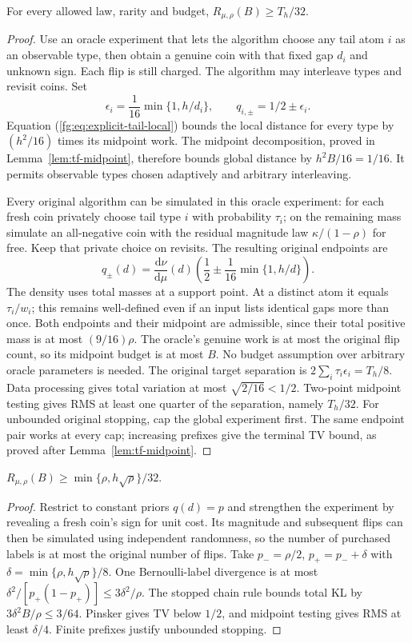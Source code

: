 \begin{lemma}\label{fg:lem:tail}
For every allowed law, rarity and budget, $R_{\mu,\rho}(B)\ge T_h/32$.
\end{lemma}
\begin{proof}
Use an oracle experiment that lets the algorithm choose any tail atom
$i$ as an observable type, then obtain a genuine coin with that fixed
gap $d_i$ and unknown sign. Each flip is still charged. The algorithm
may interleave types and revisit coins.
Set
\[
 \epsilon_i=\frac1{16}\min\{1,h/d_i\},\qquad
 q_{i,\pm}=1/2\pm\epsilon_i.
\]
Equation (\ref{fg:eq:explicit-tail-local}) bounds the local distance for
every type by $(h^2/16)$ times its midpoint work. The midpoint
decomposition, proved in Lemma~\ref{lem:tf-midpoint}, therefore bounds
global distance by $h^2B/16=1/16$. It permits observable types chosen
adaptively and arbitrary interleaving.

Every original algorithm can be simulated in this oracle experiment:
for each fresh coin privately choose tail type $i$ with probability
$\tau_i$; on the remaining mass simulate an all-negative coin with
the residual magnitude law $\kappa/(1-\rho)$ for free. Keep that
private choice on revisits. The resulting original endpoints are
\[
 q_\pm(d)=\frac{\mathrm d\nu}{\mathrm d\mu}(d)\left(\frac12\pm\frac1{16}\min\{1,h/d\}\right).
\]
The density uses total masses at a support point. At a distinct atom it
equals $\tau_i/w_i$; this remains well-defined even if an input lists
identical gaps more than once.
Both endpoints and their midpoint are admissible, since their total
positive mass is at most $(9/16)\rho$. The oracle's genuine work is
at most the original flip count, so its midpoint budget is at most $B$.
No budget assumption over arbitrary oracle parameters is needed.
The original target separation is
$2\sum_i\tau_i\epsilon_i=T_h/8$.
Data processing gives total variation at most
$\sqrt{2/16}<1/2$. Two-point midpoint testing gives RMS at least one
quarter of the separation, namely $T_h/32$.
For unbounded original stopping, cap the global experiment first.
The same endpoint pair works at every cap; increasing prefixes give
the terminal TV bound, as proved after Lemma~\ref{lem:tf-midpoint}.
\end{proof}

\begin{lemma}\label{fg:lem:floor}
$R_{\mu,\rho}(B)\ge\min\{\rho,h\sqrt\rho\}/32$.
\end{lemma}
\begin{proof}
Restrict to constant priors $q(d)=p$ and strengthen the experiment by
revealing a fresh coin's sign for unit cost. Its magnitude and subsequent
flips can then be simulated using independent randomness, so the
number of purchased labels is at most the original number of flips.
Take $p_- =\rho/2$, $p_+=p_-+\delta$ with
$\delta=\min\{\rho,h\sqrt\rho\}/8$.
One Bernoulli-label divergence is at most
$\delta^2/[p_+(1-p_+)]\le3\delta^2/\rho$.
The stopped chain rule bounds total KL by $3\delta^2B/\rho\le3/64$.
Pinsker gives TV below $1/2$, and midpoint testing gives RMS
at least $\delta/4$. Finite prefixes justify unbounded stopping.
\end{proof}

